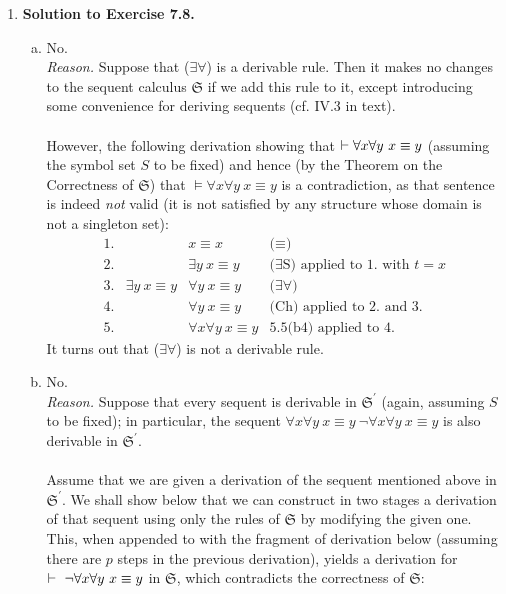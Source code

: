 \begin{enumerate}[1.]
\textit{Proof.} Since for an $S$-formula $\varphi$, $\Phi \derives_S \varphi$ implies $\Phi \derives_{S^\prime} \varphi$. \begin{flushright}$\talloblong$\end{flushright}
%
\item \textbf{Solution to Exercise 7.8.}
\begin{enumerate}[(a)]
\item No.\\
\textit{Reason.} Suppose that ($\exists\forall$) is a derivable rule. Then it makes no changes to the sequent calculus $\mathfrak{S}$ if we add this rule to it, except introducing some convenience for deriving sequents (cf. IV.3 in text).\\
\\
However, the following derivation showing that $\vdash \forall x \forall y \ x \equiv y$ (assuming the symbol set $S$ to be fixed) and hence (by the Theorem on the Correctness of $\mathfrak{S}$) that $\models \forall x \forall y \ x \equiv y$ is a contradiction, as that sentence is indeed \emph{not} valid (it is not satisfied by any structure whose domain is not a singleton set):\\
\[
\begin{array}{llll}
1. & \ & x \equiv x & \mbox{($\equiv$)}\\
2. & \ & \exists y \ x \equiv y & \mbox{($\exists$S) applied to 1. with $t = x$}\\
3. & \exists y \ x \equiv y & \forall y \ x \equiv y & \mbox{($\exists\forall$)}\\
4. & \ & \forall y \ x \equiv y & \mbox{(Ch) applied to 2. and 3.}\\
5. & \ & \forall x \forall y \ x \equiv y & \mbox{5.5(b4) applied to 4.}
\end{array}
\]
It turns out that ($\exists\forall$) is not a derivable rule.
\item No.\\
\textit{Reason.} Suppose that every sequent is derivable in $\mathfrak{S}^\prime$ (again, assuming $S$ to be fixed); in particular, the sequent $\forall x \forall y \  x \equiv y \ \neg \forall x \forall y \ x \equiv y$ is also derivable in $\mathfrak{S}^\prime$.\\
\\
Assume that we are given a derivation of the sequent mentioned above in $\mathfrak{S}^\prime$. We shall show below that we can construct in two stages a derivation of that sequent using only the rules of $\mathfrak{S}$ by modifying the given one. This, when appended to with the fragment of derivation below (assuming there are $p$ steps in the previous derivation), yields a derivation for $\vdash \ \neg\forall x \forall y \ x \equiv y$ in $\mathfrak{S}$, which contradicts the correctness of $\mathfrak{S}$:

\end{enumerate}
\end{enumerate}
